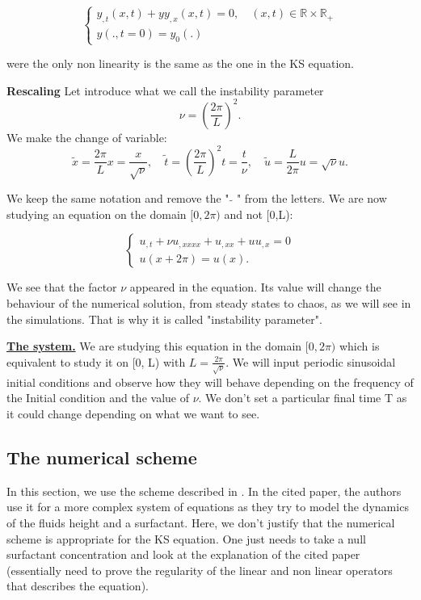 \documentclass[12pt]{article}
\begin{document}
\begin{equation*}
    \left\{
    \begin{aligned}
        y_{,t}(x, t) + yy_{,x}(x, t) = 0, \quad  (x,t) \in \mathbb{R}\times \mathbb{R}_+\\
        y(., t=0)=y_0(.)
    \end{aligned}
    \right.
\end{equation*}

were the only non linearity is the same as the one in the KS equation.

\textbf{Rescaling}
Let introduce what we call the instability parameter \begin{equation}
    \nu = \left( \frac{2\pi}{L}\right)^2.
\end{equation}
We make the change of variable:
\begin{equation}
    \tilde{x}= \frac{2\pi}{L}x = \frac{x}{\sqrt{\nu}},\quad \tilde{t}=\left( \frac{2\pi}{L}\right)^2t =\frac{t}{\nu},\quad  \tilde{u}=\frac{L}{2\pi}u=\sqrt{\nu}u.
\end{equation}

We keep the same notation and remove the " $\tilde{}$ " from the letters. We are now studying an equation on the domain $[0,2\pi)$ and not [0,L): 


\begin{equation}\label{KS_eq_2pi}
\left\{
\begin{aligned}
    u_{,t}  + \nu u_{,xxxx} + u_{,xx} + uu_{,x} = 0 \\
    u(x+2\pi)=u(x). 
\end{aligned}
\right.
\end{equation}

We see that the factor $\nu$ appeared in the equation. Its value will change the behaviour of the numerical solution, from steady states to chaos, as we will see in the simulations. That is why it is called "instability parameter".

\underline{\textbf{The system.}} We are studying this equation in the domain $[0, 2\pi)$ which is equivalent to study it on [0, L) with $L=\frac{2\pi}{\sqrt{\nu}}$. We will input periodic sinusoidal initial conditions and observe how they will behave depending on the frequency of the Initial condition and the value of $\nu$. We don't set a particular final time T as it could change depending on what we want to see.
\subsection{The numerical scheme}
In this section, we use the scheme described in \cite{Scheme_for_KS}. In the cited paper, the authors use it for a more complex system of equations as they try to model the dynamics of the fluids height and a surfactant. 
Here, we don't justify that the numerical scheme is appropriate for the KS equation. One just needs to take a null surfactant concentration and look at the explanation of the cited paper (essentially need to prove the regularity of the linear and non linear operators that describes the equation).  
\end{document}
